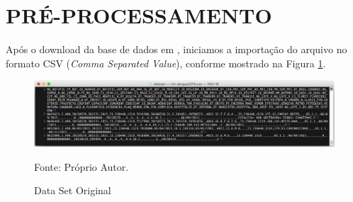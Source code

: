 \documentclass[
	12pt,				%
	openright,			%
	oneside,	
	a4paper,				%
	english,				%
	brazil				%
]{abntex2/abntex2} %
\begin{document}

	\vspace{-1.5\baselineskip}
	\section{PRÉ-PROCESSAMENTO}
	\vspace{1\baselineskip}
	\label{Pré-processamento}
	
	Após o download da base de dados em \cite{fortaleza:2015},  iniciamos a importação do arquivo no formato CSV (\textit{Comma Separated Value}), conforme mostrado na Figura \ref{figdataSetOriginal}.
	
		
		\begin{figure}[!htb]
			\caption{\label{figdataSetOriginal} \fontsize{10}{\baselineskip} \selectfont Data Set Original}
			\begin{center}
				\includegraphics[scale=0.4]{img/dataSetOriginal.png}
			\end{center}
			{\fontsize{10}{\baselineskip} \selectfont Fonte: Próprio Autor.}
		\end{figure}
	
\end{document}
